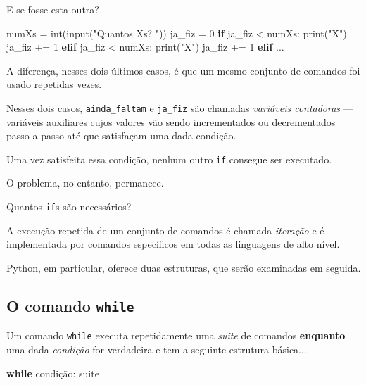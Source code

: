 \documentclass[11pt,a4paper]{article}
\newenvironment{Shaded}{}{}
\newcommand{\DecValTok}[1]{\textcolor[rgb]{0.25,0.63,0.44}{{#1}}}
\newcommand{\StringTok}[1]{\textcolor[rgb]{0.25,0.44,0.63}{{#1}}}
\newcommand{\NormalTok}[1]{{#1}}
\newcommand{\ControlFlowTok}[1]{\textcolor[rgb]{0.00,0.44,0.13}{\textbf{{#1}}}}
\newcommand{\OperatorTok}[1]{\textcolor[rgb]{0.40,0.40,0.40}{{#1}}}
\newcommand{\BuiltInTok}[1]{{#1}}
\begin{document}
    E se fosse esta outra?

    \begin{Shaded}
\begin{Highlighting}[]
\NormalTok{numXs }\OperatorTok{=} \BuiltInTok{int}\NormalTok{(}\BuiltInTok{input}\NormalTok{(}\StringTok{"Quantos Xs? "}\NormalTok{))}
\NormalTok{ja_fiz }\OperatorTok{=} \DecValTok{0}
\ControlFlowTok{if}\NormalTok{ ja_fiz }\OperatorTok{<}\NormalTok{ numXs:}
   \BuiltInTok{print}\NormalTok{(}\StringTok{"X"}\NormalTok{)}
\NormalTok{   ja_fiz }\OperatorTok{+=} \DecValTok{1}
\ControlFlowTok{elif}\NormalTok{ ja_fiz }\OperatorTok{<}\NormalTok{ numXs:}
   \BuiltInTok{print}\NormalTok{(}\StringTok{"X"}\NormalTok{)}
\NormalTok{   ja_fiz }\OperatorTok{+=} \DecValTok{1}
\ControlFlowTok{elif}\NormalTok{ ...}
\end{Highlighting}
\end{Shaded}

    A diferença, nesses dois últimos casos, é que um mesmo conjunto de
comandos foi usado repetidas vezes.

Nesses dois casos, \texttt{ainda\_faltam} e \texttt{ja\_fiz} são
chamadas \emph{variáveis contadoras} --- variáveis auxiliares cujos
valores vão sendo incrementados ou decrementados passo a passo até que
satisfaçam uma dada condição.

Uma vez satisfeita essa condição, nenhum outro \texttt{if} consegue ser
executado.

    O problema, no entanto, permanece.

Quantos \texttt{if}s são necessários?

    A execução repetida de um conjunto de comandos é chamada \emph{iteração}
e é implementada por comandos específicos em todas as linguagens de alto
nível.

Python, em particular, oferece duas estruturas, que serão examinadas em
seguida.

    \subsection{\texorpdfstring{O comando
\texttt{while}}{O comando while}}\label{o-comando-while}

    Um comando \texttt{while} executa repetidamente uma \emph{suite} de
comandos \textbf{enquanto} uma dada \emph{condição} for verdadeira e tem
a seguinte estrutura básica...

\begin{Shaded}
\begin{Highlighting}[]
\ControlFlowTok{while}\NormalTok{ condição:}
\NormalTok{    suite}
\end{Highlighting}
\end{Shaded}
\end{document}
